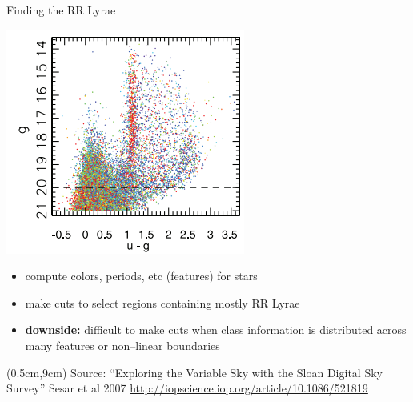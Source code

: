 \documentclass[12pt]{beamer}
\newcommand{\att}[1]{\begin{textblock*}{12cm}(0.5cm,9cm) %
  {\tiny Source: #1}
      \end{textblock*}}
\begin{document}
\begin{frame}{Finding the RR Lyrae}

\vspace{-.1in}
  
  \begin{center}
    \includegraphics[scale=0.5]{figs/rr_color.png}
    \end{center}

\vspace{-.1in}
  
  \begin{itemize}
  \item compute colors, periods, etc (features) for stars
  \item make cuts to select regions containing mostly RR Lyrae
  \item \textbf{downside:} difficult to make cuts when class information is distributed across many features or non--linear boundaries
  \end{itemize}
  
\att{``Exploring the Variable Sky with the Sloan Digital Sky Survey'' Sesar et al 2007 \url{http://iopscience.iop.org/article/10.1086/521819}\\}
  
\end{frame}
\end{document}
